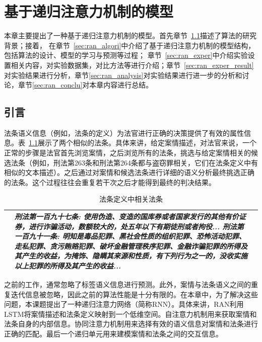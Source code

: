 
\chapter{基于递归注意力机制的模型}
本章主要提出了一种基于递归注意力机制的模型。首先章节~\ref{sec:ran_intro}描述了算法的研究背景；接着，
在章节~\ref{sec:ran_algori}中介绍了基于递归注意力机制的模型结构，包括算法的设计、模型的学习与预测等过程；
章节~\ref{sec:ran_exper}中介绍实验设置相关内容，对实验数据集，对比方法等进行介绍；章节~\ref{sec:ran_exper_result}
对实验结果进行分析，章节\ref{sec:ran_analysis}对实验结果进行进一步的分析和讨论，章节\ref{sec:ran_conclu}对本章内容进行总结。

\section{引言}
\label{sec:ran_intro}
法条语义信息（例如，法条的定义）为法官进行正确的决策提供了有效的属性信息。表~\ref{t:similar_article}展示了两个相似的法条。具体来讲，给定案情描述，对法官来说，一个正常的步骤是法官首先浏览案情，之后浏览所有的法条，挑选与给定案情相关的候选法条（例如，刑法第263条和刑法第264条都与盗窃罪相关，它们在法条定义中有相似的文本描述）。之后通过对案情和候选法条进行详细的语义分析最终挑选正确的法条。这个过程往往会重复若干次之后才能得到最终的判决结果。

\begin{table}[t!]
    \caption{法条定义中相关法条}
    \label{t:similar_article}
    \centering
    \begin{tabular}{lp{12cm}p{7cm}}
    \hline
    &\emph{\textbf{刑法第一百九十七条}: 使用伪造、变造的国库券或者国家发行的其他有价证券，进行\emph{\textbf{诈骗}}活动，数额较大的，处五年以下有期徒刑或者拘役... \newline
    \textbf{刑法第一百九十一条}: 明知是毒品犯罪、黑社会性质的组织犯罪、恐怖活动犯罪、走私犯罪、贪污贿赂犯罪、破坏金融管理秩序犯罪、\emph{\textbf{金融诈骗}}犯罪的所得及其产生的收益，为掩饰、隐瞒其来源和性质，有下列行为之一的，没收实施以上犯罪的所得及其产生的收益...}\\
    \hline
    \end{tabular}
\end{table}

之前的工作，通常忽略了标签语义信息进行预测。此外，案情与法条语义之间的重复迭代信息被忽略，因此之前的算法性能是十分有限的。在本章中，为了解决这些问题，本课题提出了一种递归注意力网络（简称RNN）。具体来讲，RAN利用LSTM将案情描述和法条定义映射到一个低维空间。自注意力机制用来获取案情和法条自身的内部信息。协同注意力机制用来选择有效的语义信息对案情和法条进行正确的匹配。最后一个递归单元用来建模案情和法条之间的交互信息。


